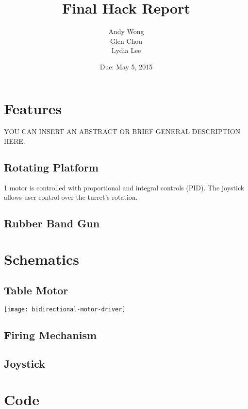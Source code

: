 \documentclass[a4paper, 11pt]{article}
\title{Final Hack Report}\author{Andy Wong\\Glen Chou\\Lydia Lee}\date{Due: May 5, 2015}
\begin{document}
\pagestyle{fancy}
\fancyhf{}
\maketitle
\tableofcontents

\newpage
\section{Features}
YOU CAN INSERT AN ABSTRACT OR BRIEF GENERAL DESCRIPTION HERE.
	\subsection{Rotating Platform}
		1 motor is controlled with proportional and integral controls (PID).  The joystick allows user control over the turret's rotation.
	\subsection{Rubber Band Gun}
\newpage
\section{Schematics}
	\subsection{Table Motor}
		\begin{center}
			\texttt{[image: bidirectional-motor-driver]}
		\end{center}
	\subsection{Firing Mechanism}
		\begin{center}
		\end{center}
	\subsection{Joystick}
		\begin{center}
		\end{center}
\section{Code}
\end{document}
